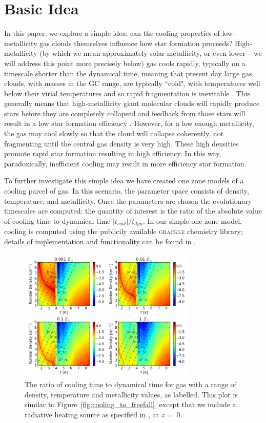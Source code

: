 \documentclass[useAMS,usenatbib]{mn2e}
\begin{document}
%
\section{Basic Idea}
\label{sec:basic}

In this paper, we explore a simple idea: can the cooling properties of low-metallicity gas clouds themselves influence how star formation proceeds?  High-metallicity (by which we mean approximately solar metallicity, or even lower -- we will address this point more precisely below) gas cools rapidly, typically on a timescale shorter than the dynamical time, meaning that present day large gas clouds, with masses in the GC range, are typically ``cold", with temperatures well below their virial temperatures and so rapid fragmentation is inevitable \citep{Hoyle1953}.  This generally means that high-metallicity giant molecular clouds will rapidly produce stars before they are completely collapsed and feedback from those stars will result in a low star formation efficiency \citep[e.g.,][]{McKee1989}.  However, for a low enough metallicity, the gas may cool slowly so that the cloud will collapse coherently, not fragmenting until the central gas density is very high.  These high densities promote rapid star formation resulting in high efficiency.  In this way, paradoxically, inefficient cooling may result in more efficiency star formation. 

To further investigate this simple idea we have created one zone models of a cooling parcel of gas. In  this scenario, the parameter space consists of density, temperature, and metallicity. Once the parameters are chosen the evolutionary timescales are computed: the quantity of interest is the ratio of the absolute value of cooling time to dynamical time $|t_{cool}|/t_{dyn}$. In our simple one zone model, cooling is computed using the publicily available \textsc{grackle} chemistry library; details of implementation and functionality can be found
in \cite{Bryan2014}.

\begin{figure}
\begin{center}
\mbox{\includegraphics[width=8.5cm]{Images/cooling_to_freefall}}
\end{center}
\caption{\label{fig:cooling_to_freefall_background} The ratio of cooling time to dynamical time for gas with a range of density, temperature and metallicity values, as labelled.  This plot is similar to Figure~\ref{fig:cooling_to_freefall}, except that we include a radiative heating source as specified in \citet{Haardt2012}, at $z=$ 0.}
\end{figure}
\end{document}
